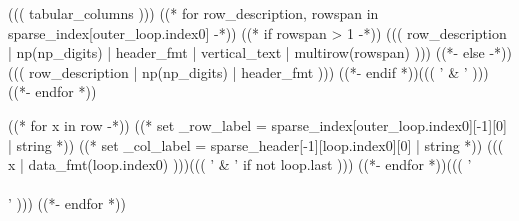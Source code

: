 \begin{tabular}{((( tabular_columns )))}
    ((* for row_description, rowspan in sparse_index[outer_loop.index0] -*))
        ((* if rowspan > 1 -*))
            ((( row_description | np(np_digits) | header_fmt | vertical_text | multirow(rowspan) )))
        ((*- else -*))
            ((( row_description | np(np_digits) | header_fmt )))
        ((*- endif *))((( '  &  ' )))
    ((*- endfor *))

    ((* for x in row -*))
        ((* set _row_label = sparse_index[outer_loop.index0][-1][0] | string *))
        ((* set _col_label = sparse_header[-1][loop.index0][0] | string *))
        ((( x | data_fmt(loop.index0) )))((( '  &  ' if not loop.last )))
    ((*- endfor *))((( ' \\\\\n' )))
((*- endfor *))

\bottomrule
\end{tabular}
